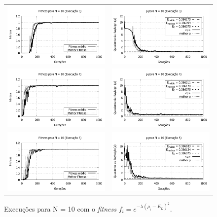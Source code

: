 \begin{figure}[p]
\begin{tabular}{@{}cc@{}}
		\includegraphics[width=.40\textwidth]{figs/resultados/fitnessEL/N-10_E-3_fitness-extendido.pdf} &
    \includegraphics[width=.40\textwidth]{figs/resultados/fitnessEL/N-10_E-3_rho_extendido.pdf}   \\
		\includegraphics[width=.40\textwidth]{figs/resultados/fitnessEL/N-10_E-4_fitness-extendido.pdf} &
    \includegraphics[width=.40\textwidth]{figs/resultados/fitnessEL/N-10_E-4_rho_extendido.pdf} \\
		\includegraphics[width=.40\textwidth]{figs/resultados/fitnessEL/N-10_E-5_fitness-extendido.pdf} &
    \includegraphics[width=.40\textwidth]{figs/resultados/fitnessEL/N-10_E-5_rho_extendido.pdf}
  \end{tabular}
  \caption{Execuções para N = 10 com o \textit{fitness} $f_i = e^{-\lambda(\rho_i - E_L)^2}$.}
	\label{fig:execucoes_N10_EL}
	\end{figure}
		
